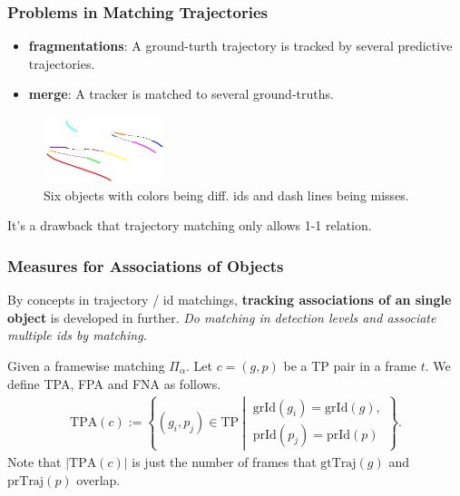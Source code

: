 \documentclass[slidetop, mathserif]{beamer}
\begin{document}

\begin{frame}
	\frametitle{Problems in Matching Trajectories}
			
	\begin{itemize}
		\item {\bf fragmentations}:
		      A ground-turth trajectory is tracked by
		      several predictive trajectories.
		\item {\bf merge}:
		      A tracker is matched to several ground-truths.
	\end{itemize}
		
	\begin{figure}
		\includegraphics[width=100pt]{pics/fig9.png}
		\caption{Six objects with colors being diff. ids and dash lines being misses.}
	\end{figure}
		
	\vspace{-15pt}
	It's a drawback that trajectory matching only allows 1-1 relation.
			
\end{frame}

\begin{frame}
	\frametitle{Measures for Associations of Objects}
			
	By concepts in trajectory / id matchings,
	{\bf tracking associations of an single object} is developed in further.
	\emph{Do matching in detection levels and associate multiple ids by matching.}
			
	\vspace{4pt}
			
	Given a framewise matching $\Pi_\alpha$.
	Let $c = (g,p)$ be a TP pair in a frame $t$.
	We define TPA, FPA and FNA as follows.
	\begin{align*}
		\text{TPA}(c) :=                       
		\left\{(g_i, p_j)\in\text{TP}\ \left|\ 
		\begin{array}{c}                       
		\text{grId}(g_i)=\text{grId}(g),       \\
		\text{prId}(p_j) = \text{prId}(p)      
		\end{array}\right.                     
		\right\}.                              
	\end{align*}
	Note that $|\text{TPA}(c)|$ is just the number of frames that $\text{gtTraj}(g)$
	and $\text{prTraj}(p)$ overlap.
			
\end{frame}
\end{document}
